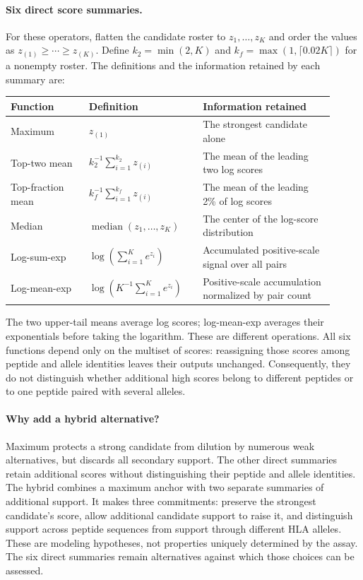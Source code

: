 \documentclass[11pt]{article}
\begin{document}
\paragraph{Six direct score summaries.}
For these operators, flatten the candidate roster to \(z_1,\ldots,z_K\)
and order the values as \(z_{(1)}\geq\cdots\geq z_{(K)}\). Define
\(k_2=\min(2,K)\) and \(k_f=\max(1,\lceil0.02K\rceil)\) for a
nonempty roster. The definitions and the information retained by each
summary are:

\begin{center}
\small
\begin{tabular}{@{}p{0.22\linewidth}p{0.32\linewidth}p{0.37\linewidth}@{}}
\toprule
Function & Definition & Information retained \\
\midrule
Maximum & \(z_{(1)}\)
& The strongest candidate alone \\
\addlinespace
Top-two mean & \(k_2^{-1}\sum_{i=1}^{k_2}z_{(i)}\)
& The mean of the leading two log scores \\
\addlinespace
Top-fraction mean & \(k_f^{-1}\sum_{i=1}^{k_f}z_{(i)}\)
& The mean of the leading 2\% of log scores \\
\addlinespace
Median & \(\operatorname{median}(z_1,\ldots,z_K)\)
& The center of the log-score distribution \\
\addlinespace
Log-sum-exp & \(\log\!\left(\sum_{i=1}^{K}e^{z_i}\right)\)
& Accumulated positive-scale signal over all pairs \\
\addlinespace
Log-mean-exp & \(\log\!\left(K^{-1}\sum_{i=1}^{K}e^{z_i}\right)\)
& Positive-scale accumulation normalized by pair count \\
\bottomrule
\end{tabular}
\end{center}

The two upper-tail means average log scores; log-mean-exp averages their
exponentials before taking the logarithm. These are different operations.
All six functions depend only on the multiset of scores: reassigning those
scores among peptide and allele identities leaves their outputs unchanged.
Consequently, they do not distinguish whether additional high scores belong
to different peptides or to one peptide paired with several alleles.

\paragraph{Why add a hybrid alternative?}
Maximum protects a strong candidate from dilution by numerous weak
alternatives, but discards all secondary support. The other direct summaries
retain additional scores without distinguishing their peptide and allele
identities. The hybrid combines a maximum anchor with two separate summaries
of additional support. It makes three commitments: preserve the strongest
candidate's score, allow additional candidate support to raise it, and
distinguish support across peptide sequences from support through different
HLA alleles. These are modeling hypotheses, not properties uniquely
determined by the assay. The six direct summaries remain alternatives against
which those choices can be assessed.
\end{document}
